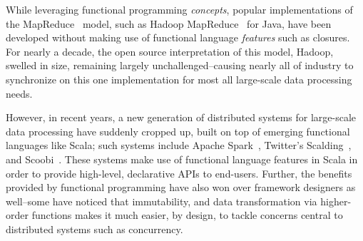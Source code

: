 \documentclass{jfp1}
\newcommand{\fixme}[1]{{\color{gray}\itshape#1}}
\begin{document}
While leveraging functional programming {\em concepts}, popular implementations
of the MapReduce~\cite{MapReduce} model, such as Hadoop MapReduce~\cite{Hadoop}
for Java, have been developed without making use of functional language {\em
features} such as closures. For nearly a decade, the open source interpretation
of this model, Hadoop, swelled in size, remaining largely unchallenged--causing
nearly all of industry to synchronize on this one implementation for most all
large-scale data processing needs.

However, in recent years, a new generation of distributed systems for
large-scale data processing have suddenly cropped up, built on top of emerging
functional languages like Scala; such systems include Apache Spark~\cite{Spark},
Twitter's Scalding~\cite{Scalding}, and Scoobi~\cite{Scoobi}. These systems make
use of functional language features in Scala in order to provide high-level,
declarative APIs to end-users. Further, the benefits provided by functional
programming have also won over framework designers as well--some have noticed
that immutability, and data transformation via higher-order functions makes it
much easier, by design, to tackle concerns central to distributed systems such
as concurrency.


%
%
%
%
\end{document}
